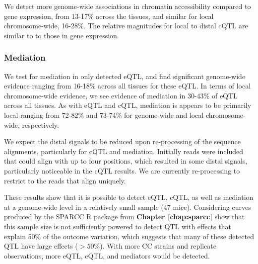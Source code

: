 We detect more genome-wide associations in chromatin accessibility compared to gene expression, from 13-17\% across the tissues, and similar for local chromosome-wide, 16-28\%. The relative magnitudes for local to distal cQTL are similar to to those in gene expression.  

\subsubsection{Mediation}

We test for mediation in only detected eQTL, and find significant genome-wide evidence ranging from 16-18\% across all tissues for these eQTL. In terms of local chromosome-wide evidence, we see evidence of mediation in 30-43\% of eQTL across all tissues. As with eQTL and cQTL, mediation is appears to be primarily local ranging from 72-82\% and 73-74\% for genome-wide and local chromosome-wide, respectively.

We expect the distal signals to be reduced upon re-processing of the sequence alignments, particularly for cQTL and mediation. Initially reads were included that could align with up to four positions, which resulted in some distal signals, particularly noticeable in the cQTL results. We are currently re-processing to restrict to the reads that align uniquely.

These results show that it is possible to detect eQTL, cQTL, as well as mediation at a genome-wide level in a relatively small sample (47 mice). Considering curves produced by the SPARCC R package from \textbf{Chapter \ref{chap:sparcc}} show that this sample size is not sufficiently powered to detect QTL with effects that explain 50\% of the outcome variation, which suggests that many of these detected QTL have large effects ($> 50\%$). With more CC strains and replicate observations, more eQTL, cQTL, and mediators would be detected.

